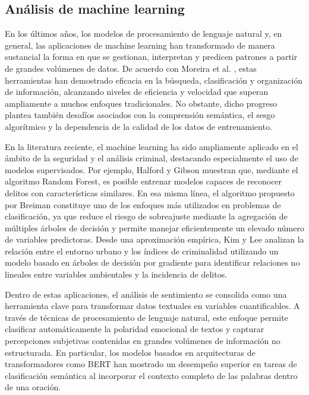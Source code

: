 \documentclass[sn-basic,pdflatex]{sn-jnl}
\theoremstyle{remark}
\theoremstyle{definition}
\begin{document}
\subsection{Análisis de machine
learning}\label{anuxe1lisis-de-machine-learning}

En los últimos años, los modelos de procesamiento de lenguaje natural y,
en general, las aplicaciones de machine learning han transformado de
manera sustancial la forma en que se gestionan, interpretan y predicen
patrones a partir de grandes volúmenes de datos. De acuerdo con Moreira
et al. \citep{moreira2021}, estas herramientas han demostrado eficacia
en la búsqueda, clasificación y organización de información, alcanzando
niveles de eficiencia y velocidad que superan ampliamente a muchos
enfoques tradicionales. No obstante, dicho progreso plantea también
desafíos asociados con la comprensión semántica, el sesgo algorítmico y
la dependencia de la calidad de los datos de entrenamiento.

En la literatura reciente, el machine learning ha sido ampliamente
aplicado en el ámbito de la seguridad y el análisis criminal, destacando
especialmente el uso de modelos supervisados. Por ejemplo, Halford y
Gibson \citep{halford2025} muestran que, mediante el algoritmo Random
Forest, es posible entrenar modelos capaces de reconocer delitos con
características similares. En esa misma línea, el algoritmo propuesto
por Breiman \citep{breiman2001} constituye uno de los enfoques más
utilizados en problemas de clasificación, ya que reduce el riesgo de
sobreajuste mediante la agregación de múltiples árboles de decisión y
permite manejar eficientemente un elevado número de variables
predictoras. Desde una aproximación empírica, Kim y Lee \citep{kim2023}
analizan la relación entre el entorno urbano y los índices de
criminalidad utilizando un modelo basado en árboles de decisión por
gradiente para identificar relaciones no lineales entre variables
ambientales y la incidencia de delitos.

Dentro de estas aplicaciones, el análisis de sentimiento se consolida
como una herramienta clave para transformar datos textuales en variables
cuantificables. A través de técnicas de procesamiento de lenguaje
natural, este enfoque permite clasificar automáticamente la polaridad
emocional de textos y capturar percepciones subjetivas contenidas en
grandes volúmenes de información no estructurada. En particular, los
modelos basados en arquitecturas de transformadores como BERT
\citep{devlin2019} han mostrado un desempeño superior en tareas de
clasificación semántica al incorporar el contexto completo de las
palabras dentro de una oración.
\end{document}
